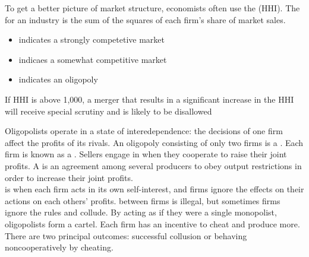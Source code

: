 \documentclass{article}
\begin{document}
To get a better picture of market structure, economists often use the  (HHI). The  for an industry is the sum of the squares of each firm's share of market sales. 
\begin{itemize}
  \item {} indicates a strongly competetive market 
  \item {} indicaes a somewhat competitive market 
  \item {} indicates an oligopoly
\end{itemize}

\begin{remark}
  If HHI is above 1,000, a merger that results in a significant increase in the HHI will receive special scrutiny and is likely to be disallowed
\end{remark}

Oligopolists operate in a state of interedependence: the decisions of one firm affect the profits of its rivals. An oligopoly consisting of only two firms is a . Each firm is known as a . Sellers engage in  when they cooperate to raise their joint profits. A  is an agreement among several producers to obey output restrictions in order to increase their joint profits. \\

 is when each firm acts in its own self-interest, and firms ignore the effects on their actions on each others' profits.  between firms is illegal, but sometimes firms ignore the rules and collude. By acting as if they were a single monopolist, oligopolists form a cartel. Each firm has an incentive to cheat and produce more. There are two principal outcomes: successful collusion or behaving noncooperatively by cheating. \\ 
\end{document}
